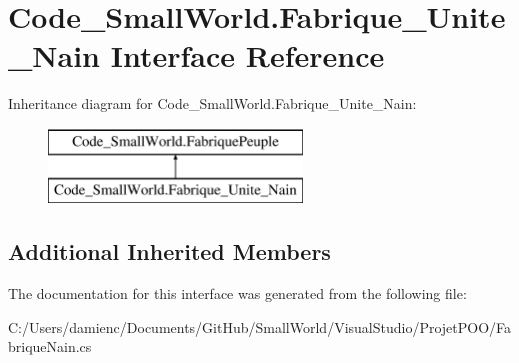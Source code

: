 \hypertarget{interface_code___small_world_1_1_fabrique___unite___nain}{\section{Code\-\_\-\-Small\-World.\-Fabrique\-\_\-\-Unite\-\_\-\-Nain Interface Reference}
\label{interface_code___small_world_1_1_fabrique___unite___nain}
}
Inheritance diagram for Code\-\_\-\-Small\-World.\-Fabrique\-\_\-\-Unite\-\_\-\-Nain\-:\begin{figure}[H]
\begin{center}
\leavevmode
\includegraphics[height=2.000000cm]{interface_code___small_world_1_1_fabrique___unite___nain}
\end{center}
\end{figure}
\subsection*{Additional Inherited Members}


The documentation for this interface was generated from the following file\-:\begin{DoxyCompactItemize}
\item 
C\-:/\-Users/damienc/\-Documents/\-Git\-Hub/\-Small\-World/\-Visual\-Studio/\-Projet\-P\-O\-O/Fabrique\-Nain.\-cs\end{DoxyCompactItemize}
